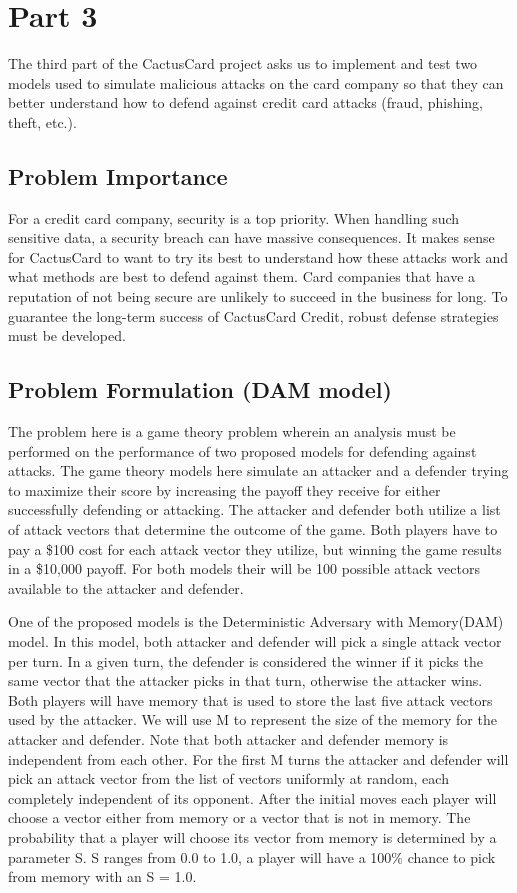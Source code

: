 \documentclass[11pt,journal]{IEEEtran}
\begin{document}
\section{Part 3} \label{part3}
The third part of the CactusCard project asks us to implement and test two models used to simulate malicious attacks on the card company so that they can better understand how to defend against credit card attacks (fraud, phishing, theft, etc.).

\subsection{Problem Importance}
For a credit card company, security is a top priority. When handling such sensitive data, a security breach can have massive consequences. It makes sense for CactusCard to want to try its best to understand how these attacks work and what methods are best to defend against them. Card companies that have a reputation of not being secure are unlikely to succeed in the business for long. To guarantee the long-term success of CactusCard Credit, robust defense strategies must be developed. 

\subsection{Problem Formulation (DAM model)}
The problem here is a game theory problem wherein an analysis must be performed on the performance of two proposed models for defending against attacks. The game theory models here simulate an attacker and a defender trying to maximize their score by increasing the payoff they receive for either successfully defending or attacking. The attacker and defender both utilize a list of attack vectors that determine the outcome of the game. Both players have to pay a \$100 cost for each attack vector they utilize, but winning the game results in a \$10,000 payoff. For both models their will be 100 possible attack vectors available to the attacker and defender.
\par
One of the proposed models is the Deterministic Adversary with Memory(DAM) model. In this model, both attacker and defender will pick a single attack vector per turn. In a given turn, the defender is considered the winner if it picks the same vector that the attacker picks in that turn, otherwise the attacker wins. Both players will have memory that is used to store the last five attack vectors used by the attacker. We will use M to represent the size of the memory for the attacker and defender. Note that both attacker and defender memory is independent from each other. For the first M turns the attacker and defender will pick an attack vector from the list of vectors uniformly at random, each completely independent of its opponent. After the initial moves each player will choose a vector either from memory or a vector that is not in memory. The probability that a player will choose its vector from memory is determined by a parameter S. S ranges from 0.0 to 1.0, a player will have a 100\% chance to pick from memory with an S = 1.0.
\end{document}
